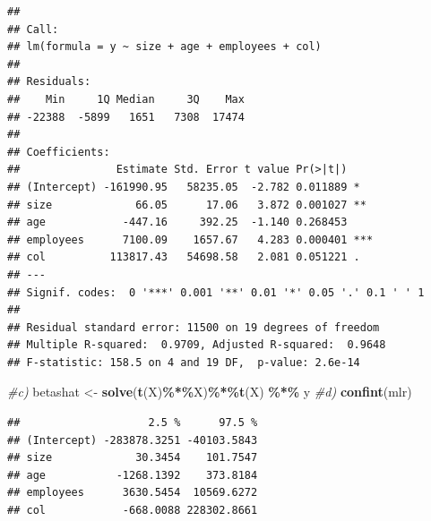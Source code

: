\documentclass[
]{article}
\newenvironment{Shaded}{\begin{snugshade}}{\end{snugshade}}
\newcommand{\CommentTok}[1]{\textcolor[rgb]{0.56,0.35,0.01}{\textit{#1}}}
\newcommand{\FunctionTok}[1]{\textcolor[rgb]{0.13,0.29,0.53}{\textbf{#1}}}
\newcommand{\NormalTok}[1]{#1}
\newcommand{\OtherTok}[1]{\textcolor[rgb]{0.56,0.35,0.01}{#1}}
\newcommand{\SpecialCharTok}[1]{\textcolor[rgb]{0.81,0.36,0.00}{\textbf{#1}}}
\begin{document}
\begin{Shaded}
\end{Shaded}

\begin{verbatim}
## 
## Call:
## lm(formula = y ~ size + age + employees + col)
## 
## Residuals:
##    Min     1Q Median     3Q    Max 
## -22388  -5899   1651   7308  17474 
## 
## Coefficients:
##               Estimate Std. Error t value Pr(>|t|)    
## (Intercept) -161990.95   58235.05  -2.782 0.011889 *  
## size             66.05      17.06   3.872 0.001027 ** 
## age            -447.16     392.25  -1.140 0.268453    
## employees      7100.09    1657.67   4.283 0.000401 ***
## col          113817.43   54698.58   2.081 0.051221 .  
## ---
## Signif. codes:  0 '***' 0.001 '**' 0.01 '*' 0.05 '.' 0.1 ' ' 1
## 
## Residual standard error: 11500 on 19 degrees of freedom
## Multiple R-squared:  0.9709, Adjusted R-squared:  0.9648 
## F-statistic: 158.5 on 4 and 19 DF,  p-value: 2.6e-14
\end{verbatim}

\begin{Shaded}
\begin{Highlighting}[]
\CommentTok{\#c)}
\NormalTok{betashat }\OtherTok{\textless{}{-}} \FunctionTok{solve}\NormalTok{(}\FunctionTok{t}\NormalTok{(X)}\SpecialCharTok{\%*\%}\NormalTok{X)}\SpecialCharTok{\%*\%}\FunctionTok{t}\NormalTok{(X) }\SpecialCharTok{\%*\%}\NormalTok{ y}
\CommentTok{\#d)}
\FunctionTok{confint}\NormalTok{(mlr)}
\end{Highlighting}
\end{Shaded}

\begin{verbatim}
##                    2.5 %      97.5 %
## (Intercept) -283878.3251 -40103.5843
## size             30.3454    101.7547
## age           -1268.1392    373.8184
## employees      3630.5454  10569.6272
## col            -668.0088 228302.8661
\end{verbatim}
\end{document}
